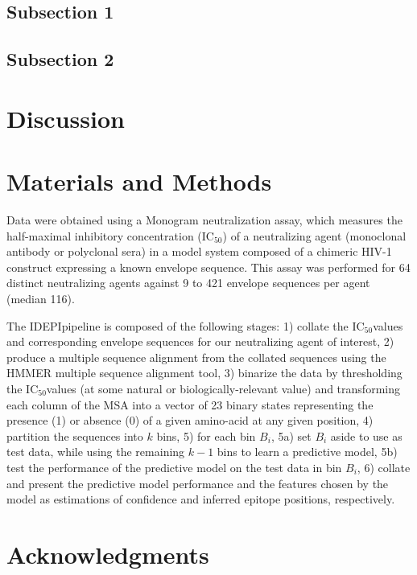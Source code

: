 \documentclass[10pt]{article}
\newcommand{\hmic}{{IC}$_{50}$}
\newcommand{\idepi}{{IDEPI}}
\begin{document}
\subsection*{Subsection 1}

\subsection*{Subsection 2}

\section*{Discussion}

\section*{Materials and Methods}
Data were obtained using a Monogram neutralization assay,
which measures the half-maximal inhibitory concentration (\hmic)
of a neutralizing agent (monoclonal antibody or polyclonal sera) in a model system composed of a chimeric HIV-1 construct expressing a known envelope sequence.
This assay was performed for 64 distinct neutralizing agents against 9 to 421 envelope sequences per agent (median 116).

The \idepi pipeline is composed of the following stages:
1) collate the \hmic values and corresponding envelope sequences for our neutralizing agent of interest,
2) produce a multiple sequence alignment from the collated sequences using the {HMMER} multiple sequence alignment tool,
3) binarize the data by thresholding the \hmic values (at some natural or biologically-relevant value)
and transforming each column of the MSA into a vector of 23 binary states representing the presence (1) or absence (0) of a given amino-acid at any given position,
4) partition the sequences into $k$ bins,
5) for each bin $B_i$,
5a) set $B_i$ aside to use as test data,
while using the remaining $k-1$ bins to learn a predictive model,
5b) test the performance of the predictive model on the test data in bin $B_i$,
6) collate and present the predictive model performance and the features chosen by the model as estimations of confidence and inferred epitope positions, respectively.

\section*{Acknowledgments}
\end{document}
